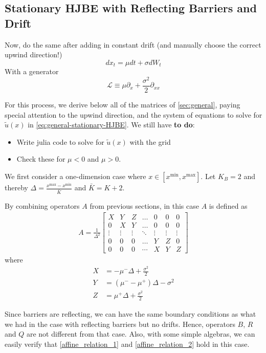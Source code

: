 \documentclass[11pt]{article}
\newcommand{\D}[1][]{\ensuremath{\partial_{#1}}}
\begin{document}
\subsection{Stationary HJBE with Reflecting Barriers and Drift}
Now, do the same after adding in constant drift (and manually choose the correct upwind direction!)
$$
d x_t = \mu dt + \sigma d W_t
$$
With a generator
$$
	\mathcal{L} \equiv \mu \D[x] + \frac{\sigma^2}{2}\D[xx]
$$

For this process, we derive below all of the matrices of \cref{sec:general}, paying special attention to the upwind direction, and the system of equations to solve for $\tilde{u}(x)$ in \cref{eq:general-stationary-HJBE}. We still have \textbf{to do}:
\begin{itemize}
	\item Write julia code to solve for $\tilde{u}(x)$ with the grid
	\item Check these for $\mu < 0$ and $\mu > 0$.
\end{itemize}

We first consider a one-dimension case where $x\in [x^{\min},x^{\max}]$. Let $K_B = 2$ and thereby $\Delta  = \frac{x^{\max}-x^{\min}}{\bar{K}}$ and $\bar{K} = K+2$.

By combining operators $A $ from previous sections, in this case $A $ is defined as
\begin{align}
A = \frac{1}{\Delta^{2}}
\begin{bmatrix}
X&Y&Z&\dots&0&0&0\\
0&X&Y&\dots&0&0&0\\
\vdots&\vdots&\vdots&\ddots&\vdots&\vdots&\vdots\\
0&0&0&\dots&Y&Z&0\\
0&0&0&\cdots&X&Y&Z
\end{bmatrix}
\end{align}
where
\begin{align*}
X &= -\mu^-\Delta+\frac{\sigma^2}{2}\\
Y &= (\mu^--\mu^+)\Delta-\sigma^2\\
Z &=\mu^+\Delta+\frac{\sigma^2}{2}
\end{align*}

Since barriers are reflecting, we can have the same boundary conditions as what we had in the case with reflecting barriers but no drifts. Hence, operators $B$, $R$ and $Q$ are not different from that case. Also, with some simple algebras, we can easily verify that \eqref{affine_relation_1} and \eqref{affine_relation_2} hold in this case.
\end{document}
